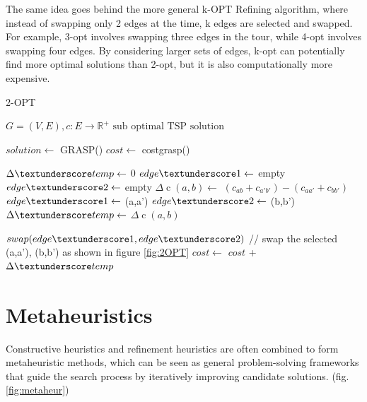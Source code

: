 The same idea goes behind the more general k-OPT Refining algorithm, where instead of swapping only 2 edges at the time, k edges are selected and swapped. For example, 3-opt involves swapping three edges in the tour, while 4-opt involves swapping four edges. By considering larger sets of edges, k-opt can potentially find more optimal solutions than 2-opt, but it is also computationally more expensive.
\begin{algorithm}[h!]
    \caption{2-OPT}\label{algo:2-OPT}
    \begin{algorithmic}[1]
    \Require $G = (V,E), c:E \to \mathbb{R}^+$
    \Ensure $\text{sub optimal TSP solution}$


    \State $solution \gets$ GRASP()
    \State $cost \gets$ cost\textunderscore grasp()
    

    \State $\Delta\textunderscore temp \gets$ 0
    \State $edge\textunderscore 1 \gets$ empty
    \State $edge\textunderscore 2 \gets$ empty
        \State $\Delta \operatorname{c}(a,b) \gets$  $(c_{ab} + c_{a'b'}) - (c_{aa'} + c_{bb'})$
        \State $edge\textunderscore 1 \gets$ (a,a')
        \State $edge\textunderscore 2 \gets$ (b,b')
        \State $\Delta\textunderscore temp \gets$ $\Delta \operatorname{c}(a,b)$
        \EndIf
        \EndFor
    \EndFor
    
    \State $swap(edge\textunderscore 1,edge\textunderscore 2) $ // swap the selected (a,a'), (b,b') as shown in figure \ref{fig:2OPT}
    \State $cost \gets  $ $cost$ + $\Delta\textunderscore temp$
    \EndIf
    

    \EndWhile

    \end{algorithmic}
\end{algorithm}



\section{Metaheuristics}



Constructive heuristics and refinement heuristics  are often combined to form metaheuristic methods, which can be seen as general problem-solving frameworks that guide the search process by iteratively improving candidate solutions. (fig.\ref{fig:metaheur}) 

